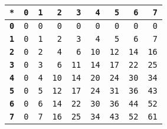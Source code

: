 \begin{tabular}{rrrrrrrrr}
\toprule
\textbf{\texttt{*}}& \textbf{\texttt{0}}& \textbf{\texttt{1}}& \textbf{\texttt{2}}& \textbf{\texttt{3}}& \textbf{\texttt{4}}& \textbf{\texttt{5}}& \textbf{\texttt{6}}& \textbf{\texttt{7}}\\ \midrule
\textbf{\texttt{0}} & \texttt{0} & \texttt{0} & \texttt{0} & \texttt{0} & \texttt{0} & \texttt{0} & \texttt{0} & \texttt{0}\\
\textbf{\texttt{1}} & \texttt{0} & \texttt{1} & \texttt{2} & \texttt{3} & \texttt{4} & \texttt{5} & \texttt{6} & \texttt{7}\\
\textbf{\texttt{2}} & \texttt{0} & \texttt{2} & \texttt{4} & \texttt{6} & \texttt{10} & \texttt{12} & \texttt{14} & \texttt{16}\\
\textbf{\texttt{3}} & \texttt{0} & \texttt{3} & \texttt{6} & \texttt{11} & \texttt{14} & \texttt{17} & \texttt{22} & \texttt{25}\\
\textbf{\texttt{4}} & \texttt{0} & \texttt{4} & \texttt{10} & \texttt{14} & \texttt{20} & \texttt{24} & \texttt{30} & \texttt{34}\\
\textbf{\texttt{5}} & \texttt{0} & \texttt{5} & \texttt{12} & \texttt{17} & \texttt{24} & \texttt{31} & \texttt{36} & \texttt{43}\\
\textbf{\texttt{6}} & \texttt{0} & \texttt{6} & \texttt{14} & \texttt{22} & \texttt{30} & \texttt{36} & \texttt{44} & \texttt{52}\\
\textbf{\texttt{7}} & \texttt{0} & \texttt{7} & \texttt{16} & \texttt{25} & \texttt{34} & \texttt{43} & \texttt{52} & \texttt{61}\\
\bottomrule
\end{tabular}
